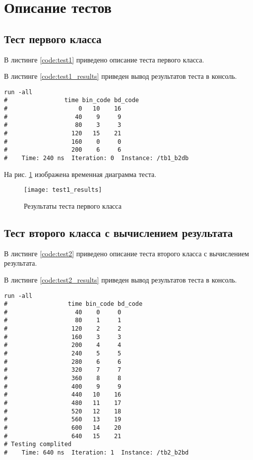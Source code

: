 \section{Описание тестов}
\label{sec:tests}

\subsection{Тест первого класса}

В листинге \ref{code:test1} приведено описание теста первого класса.


В листинге \ref{code:test1_results} приведен вывод результатов теста в консоль.
\begin{lstlisting}[caption=Результаты теста первого класса, label=code:test1_results, language={}]
run -all
# 		         time bin_code bd_code
#                    0   10    16
#                   40    9     9
#                   80    3     3
#                  120   15    21
#                  160    0     0
#                  200    6     6
#    Time: 240 ns  Iteration: 0  Instance: /tb1_b2db
\end{lstlisting}

На рис. \ref{fig:test1_results} изображена временная диаграмма теста.
\begin{figure}[H]
	\begin{center}
		\texttt{[image: test1\_results]}
		\caption{Результаты теста первого класса}
		\label{fig:test1_results}
	\end{center}
\end{figure}

\subsection{Тест второго класса с вычислением результата}

В листинге \ref{code:test2} приведено описание теста второго класса с вычислением результата.


В листинге \ref{code:test2_results} приведен вывод результатов теста в консоль.
\begin{lstlisting}[caption=Результаты теста второго класса с вычислением результата, label=code:test2_results, language={}]
run -all
# 		          time bin_code bd_code
#                   40    0     0
#                   80    1     1
#                  120    2     2
#                  160    3     3
#                  200    4     4
#                  240    5     5
#                  280    6     6
#                  320    7     7
#                  360    8     8
#                  400    9     9
#                  440   10    16
#                  480   11    17
#                  520   12    18
#                  560   13    19
#                  600   14    20
#                  640   15    21
# Testing complited
#    Time: 640 ns  Iteration: 1  Instance: /tb2_b2bd
\end{lstlisting}

